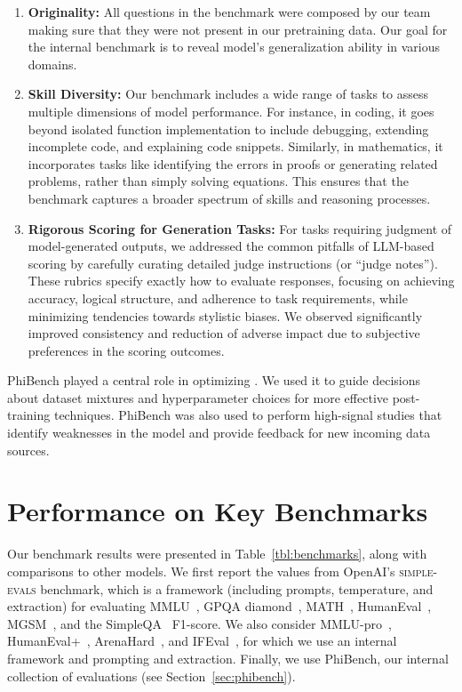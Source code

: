 \begin{enumerate}
    \item \textbf{Originality:} All questions in the benchmark were composed by our team making sure that they were not present in our pretraining data. Our goal for the internal benchmark is to reveal model's generalization ability in various domains.
    \item \textbf{Skill Diversity:} Our benchmark includes a wide range of tasks to assess multiple dimensions of model performance. For instance, in coding, it goes beyond isolated function implementation to include debugging, extending incomplete code, and explaining code snippets. Similarly, in mathematics, it incorporates tasks like identifying the errors in proofs or generating related problems, rather than simply solving equations. This ensures that the benchmark captures a broader spectrum of skills and reasoning processes.
     \item \textbf{Rigorous Scoring for Generation Tasks:} For tasks requiring judgment of model-generated outputs, we addressed the common pitfalls of LLM-based scoring by carefully curating detailed judge instructions (or “judge notes”). These rubrics specify exactly how to evaluate responses, focusing on achieving accuracy, logical structure, and adherence to task requirements, while minimizing tendencies towards stylistic biases. We observed significantly improved consistency and reduction of adverse impact due to subjective preferences in the scoring outcomes.
\end{enumerate}

PhiBench played a central role in optimizing \modelwithoutspace. We used it to guide  decisions about dataset mixtures and hyperparameter choices for more effective post-training techniques. PhiBench was also used to perform high-signal studies that identify weaknesses in the model and provide feedback for new incoming data sources. 

\section{Performance on Key Benchmarks}

Our benchmark results were presented in Table~\ref{tbl:benchmarks}, along with comparisons to other models.   We first report the values from OpenAI's \textsc{simple-evals} benchmark, which is a framework (including prompts, temperature, and extraction) for evaluating 
MMLU~\cite{hendrycks2020}, 
GPQA diamond~\cite{rein2023gpqa},
MATH~\cite{hendrycksmath2021},
HumanEval~\cite{humaneval},
MGSM~\cite{mgsm},
and the SimpleQA~\cite{simpleqa} F1-score.  We also consider MMLU-pro~\cite{mmlupro}, HumanEval+~\cite{evalplus}, ArenaHard~\cite{chiang2024chatbot}, and IFEval~\cite{ifeval}, for which we use an internal framework and prompting and extraction.  Finally, we use PhiBench, our internal collection of evaluations (see Section~\ref{sec:phibench}).

